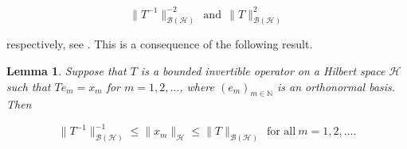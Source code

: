 \documentclass[10pt, reqno]{amsart}
\newtheorem{lemma}[theorem]{Lemma}
\theoremstyle{definition}
\newtheorem{definition}[theorem]{Definition}
\numberwithin{equation}{section}
\begin{document}
$$\|T^{-1}\|_{\mathcal{B}(\mathcal{H})}^{-2}~~\text{and}~~\|T\|_{\mathcal{B}(\mathcal{H})}^{2}$$ 

\noindent respectively, see \cite[Proposition 3.6.4]{Christensen}. This is a consequence of the following result.

\begin{lemma}{}\label{GuoWang}
    Suppose that $T$ is a bounded invertible operator on a Hilbert space $\mathcal{H}$ such that $Te_{m}=x_{m}$ for $m=1,2,\hdots$, where $(e_{m})_{m\in\mathbb{N}}$ is an orthonormal basis. Then 

\begin{equation}\label{rieszbasisinq}
    \|T^{-1}\|_{\mathcal{B(H)}}^{-1}\leq \|x_{m}\|_{\mathcal{H}} \leq \|T\|_{\mathcal{B(H)}}~~\text{for all}~m=1,2,\hdots.
\end{equation}

\end{lemma}







\end{document}
